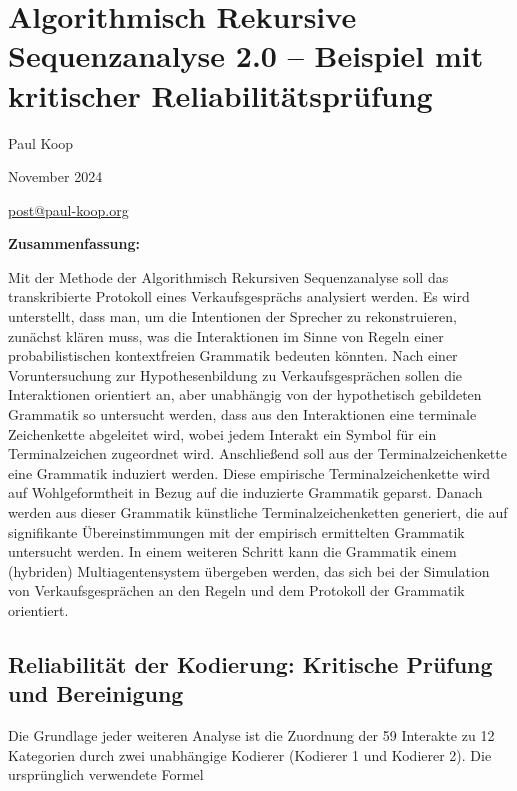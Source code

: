\documentclass[
]{article}
\author{}
\date{}
\begin{document}
\section{\texorpdfstring{\textbf{Algorithmisch Rekursive Sequenzanalyse 2.0 -- Beispiel mit kritischer Reliabilitätsprüfung}}{Algorithmisch Rekursive Sequenzanalyse 2.0 -- Beispiel mit kritischer Reliabilitätsprüfung}}\label{algorithmisch-rekursive-sequenzanalyse-2.0-beispiel-mit-kritischer-reliabilitaetspruefung}

Paul Koop

November 2024

\href{mailto:post@paul-koop.org}{\ul{post@paul-koop.org}}

\textbf{Zusammenfassung:}

Mit der Methode der Algorithmisch Rekursiven Sequenzanalyse soll das transkribierte Protokoll eines Verkaufsgesprächs analysiert werden. Es wird unterstellt, dass man, um die Intentionen der Sprecher zu rekonstruieren, zunächst klären muss, was die Interaktionen im Sinne von Regeln einer probabilistischen kontextfreien Grammatik bedeuten könnten. Nach einer Voruntersuchung zur Hypothesenbildung zu Verkaufsgesprächen sollen die Interaktionen orientiert an, aber unabhängig von der hypothetisch gebildeten Grammatik so untersucht werden, dass aus den Interaktionen eine terminale Zeichenkette abgeleitet wird, wobei jedem Interakt ein Symbol für ein Terminalzeichen zugeordnet wird. Anschließend soll aus der Terminalzeichenkette eine Grammatik induziert werden. Diese empirische Terminalzeichenkette wird auf Wohlgeformtheit in Bezug auf die induzierte Grammatik geparst. Danach werden aus dieser Grammatik künstliche Terminalzeichenketten generiert, die auf signifikante Übereinstimmungen mit der empirisch ermittelten Grammatik untersucht werden. In einem weiteren Schritt kann die Grammatik einem (hybriden) Multiagentensystem übergeben werden, das sich bei der Simulation von Verkaufsgesprächen an den Regeln und dem Protokoll der Grammatik orientiert.

\subsection{Reliabilität der Kodierung: Kritische Prüfung und Bereinigung}\label{reliabilitaet-der-kodierung-kritische-pruefung-und-bereinigung}

Die Grundlage jeder weiteren Analyse ist die Zuordnung der 59 Interakte zu 12 Kategorien durch zwei unabhängige Kodierer (Kodierer 1 und Kodierer 2). Die ursprünglich verwendete Formel
\end{document}
